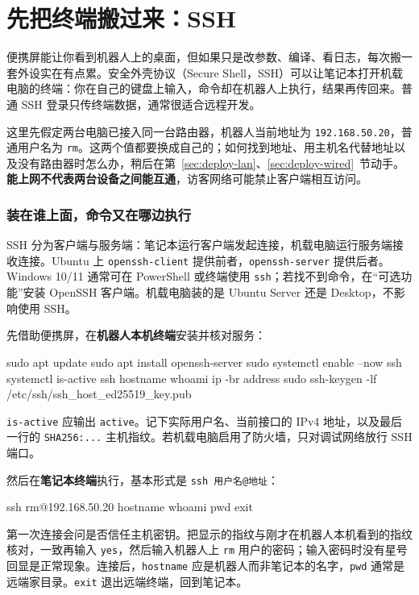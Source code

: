 \section{先把终端搬过来：SSH}
\label{sec:deploy-ssh}

便携屏能让你看到机器人上的桌面，但如果只是改参数、编译、看日志，每次搬一套外设实在有点累。安全外壳协议（Secure Shell，SSH）可以让笔记本打开机载电脑的终端：你在自己的键盘上输入，命令却在机器人上执行，结果再传回来。普通 SSH 登录只传终端数据，通常很适合远程开发。

这里先假定两台电脑已接入同一台路由器，机器人当前地址为 \texttt{192.168.50.20}，普通用户名为 \texttt{rm}。这两个值都要换成自己的；如何找到地址、用主机名代替地址以及没有路由器时怎么办，稍后在第~\ref{sec:deploy-lan}、\ref{sec:deploy-wired}~节动手。\textbf{能上网不代表两台设备之间能互通}，访客网络可能禁止客户端相互访问。

\subsubsection{装在谁上面，命令又在哪边执行}

SSH 分为客户端与服务端：笔记本运行客户端发起连接，机载电脑运行服务端接收连接。Ubuntu 上 \texttt{openssh-client} 提供前者，\texttt{openssh-server} 提供后者。Windows 10/11 通常可在 PowerShell 或终端使用 \texttt{ssh}；若找不到命令，在“可选功能”安装 OpenSSH 客户端。机载电脑装的是 Ubuntu Server 还是 Desktop，不影响使用 SSH。

\begin{example}[从笔记本进入机载电脑]
先借助便携屏，在\textbf{机器人本机终端}安装并核对服务：
\begin{tbash}
sudo apt update
sudo apt install openssh-server
sudo systemctl enable --now ssh
systemctl is-active ssh
hostname
whoami
ip -br address
sudo ssh-keygen -lf /etc/ssh/ssh_host_ed25519_key.pub
\end{tbash}
\texttt{is-active} 应输出 \texttt{active}。记下实际用户名、当前接口的 IPv4 地址，以及最后一行的 \texttt{SHA256:...} 主机指纹。若机载电脑启用了防火墙，只对调试网络放行 SSH 端口。

然后在\textbf{笔记本终端}执行，基本形式是 \texttt{ssh 用户名@地址}：
\begin{tbash}
ssh rm@192.168.50.20
hostname
whoami
pwd
exit
\end{tbash}
第一次连接会问是否信任主机密钥。把显示的指纹与刚才在机器人本机看到的指纹核对，一致再输入 \texttt{yes}，然后输入机器人上 \texttt{rm} 用户的密码；输入密码时没有星号回显是正常现象。连接后，\texttt{hostname} 应是机器人而非笔记本的名字，\texttt{pwd} 通常是远端家目录。\texttt{exit} 退出远端终端，回到笔记本。
\end{example}

